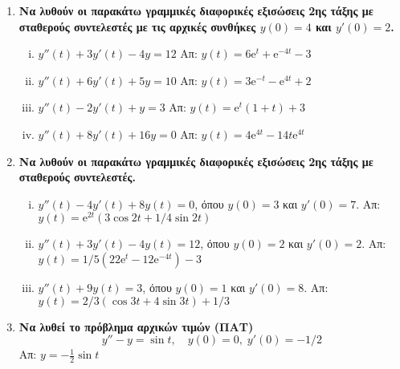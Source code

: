 \begin{enumerate}
  \item {\bfseries Να λυθούν οι παρακάτω γραμμικές διαφορικές εξισώσεις 2ης τάξης 
    με σταθερούς συντελεστές με τις αρχικές συνθήκες $ y(0)=4 $ και $ y'(0)=2 $.}
    \begin{enumerate}[i)]
      \item  $y''(t)+3y'(t) -4y=12$ 
        \hfill Απ: $ y(t)=6 \mathrm{e}^{t} + \mathrm{e}^{-4t} -3 $ 
      \item  $y''(t)+6y'(t) +5y=10$ 
        \hfill Απ: $ y(t) = 3 \mathrm{e}^{-t} - \mathrm{e}^{4t} +2  $ 
      \item  $y''(t)-2y'(t) +y=3$ \hfill Απ: $ y(t)= \mathrm{e}^{t} (1+t)+3 $  
      \item  $y''(t)+8y'(t) +16y=0$ 
        \hfill Απ: $ y(t)=4 \mathrm{e}^{4t} - 14 t\mathrm{e}^{4t} $
    \end{enumerate}

  \item {\bfseries Να λυθούν οι παρακάτω γραμμικές διαφορικές εξισώσεις 2ης τάξης 
    με σταθερούς συντελεστές.}
    \begin{enumerate}[i)]
      \item $ y''(t)-4y'(t)+8y(t)=0 $, όπου $ y(0)=3 $ και $ y'(0)=7 $.
        \hfill Απ: $ y(t)= \mathrm{e}^{2t} (3 \cos{2t} + 1/4 \sin{2t}) $  
      \item $ y''(t)+3y'(t)-4y(t)=12 $, όπου $ y(0)=2 $ και $ y'(0)=2 $.
        \hfill Απ: $ y(t)= 1/5(22\mathrm{e}^{t}-12 \mathrm{e}^{-4t} )-3 $  
      \item $ y''(t)+9y(t)=3 $, όπου $ y(0)=1 $ και $ y'(0)=8 $.
        \hfill Απ: $ y(t)= 2/3(\cos{3t} + 4 \sin{3t})+1/3 $  
    \end{enumerate}

  \item {\bfseries Να λυθεί το πρόβλημα αρχικών τιμών (ΠΑΤ)}
    \[
    y''-y=\sin t, \quad y(0)=0,\; y'(0)=-{1}/{2}
    \]
    \hfill Απ: $y= -\frac{1}{2}\sin t$

\end{enumerate}
    

